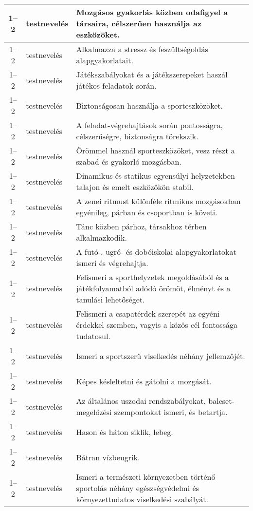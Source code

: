 \begin{small}
\begin{longtable}{c | p{2cm} |  p{11cm} }
              1--2 & testnevelés & Mozgásos gyakorlás közben odafigyel a társaira, célszerűen használja az eszközöket. \\ \hline
              1--2 & testnevelés & Alkalmazza a stressz és feszültségoldás alapgyakorlatait. \\ \hline
              1--2 & testnevelés & Játékszabályokat és a játékszerepeket haszál játékos feladatok során. \\ \hline
              1--2 & testnevelés & Biztonságosan használja a sporteszközöket. \\ \hline
              1--2 & testnevelés & A feladat-végrehajtások során pontosságra, célszerűségre, biztonságra törekszik. \\ \hline
              1--2 & testnevelés & Örömmel használ sporteszközöket, vesz részt a szabad és gyakorló mozgásban. \\ \hline
              1--2 & testnevelés & Dinamikus és statikus egyensúlyi helyzetekben talajon és emelt eszközökön stabil. \\ \hline
              1--2 & testnevelés & A zenei ritmust különféle ritmikus mozgásokban egyénileg, párban és csoportban is követi. \\ \hline
              1--2 & testnevelés & Tánc közben párhoz, társakhoz térben alkalmazkodik. \\ \hline
              1--2 & testnevelés & A futó-, ugró- és dobóiskolai alapgyakorlatokat ismeri és végrehajtja. \\ \hline
              1--2 & testnevelés & Felismeri a sporthelyzetek megoldásából és a játékfolyamatból adódó örömöt, élményt és a tanulási lehetőséget. \\ \hline
              1--2 & testnevelés & Felismeri a csapatérdek szerepét az egyéni érdekkel szemben, vagyis a közös cél fontossága tudatosul. \\ \hline
              1--2 & testnevelés & Ismeri a sportszerű viselkedés néhány jellemzőjét. \\ \hline
              1--2 & testnevelés & Képes késleltetni és gátolni a mozgását. \\ \hline
              1--2 & testnevelés & Az általános uszodai rendszabályokat, baleset-megelőzési szempontokat ismeri, és betartja. \\ \hline
              1--2 & testnevelés & Hason és háton siklik, lebeg. \\ \hline
              1--2 & testnevelés & Bátran vízbeugrik. \\ \hline
              1--2 & testnevelés & Ismeri a természeti környezetben történő sportolás néhány egészségvédelmi és környezettudatos viselkedési szabályát. \\ \hline

\end{longtable}
\end{small}
